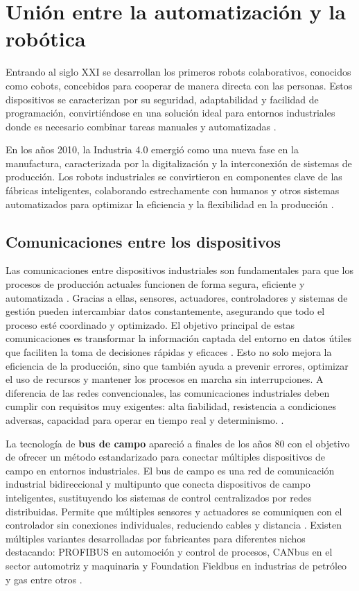 \section{Unión entre la automatización y la robótica}
\label{sec:terceraseccion}

Entrando al siglo XXI se desarrollan los primeros robots colaborativos, conocidos como cobots, concebidos para cooperar de manera directa con las personas. Estos dispositivos se caracterizan por su seguridad, adaptabilidad y facilidad de programación, convirtiéndose en una solución ideal para entornos industriales donde es necesario combinar tareas manuales y automatizadas  \cite{intro_union}. 

En los años 2010, la Industria 4.0 emergió como una nueva fase en la manufactura, caracterizada por la digitalización y la interconexión de sistemas de producción.  Los robots industriales se convirtieron en componentes clave de las fábricas inteligentes, colaborando estrechamente con humanos y otros sistemas automatizados para optimizar la eficiencia y la flexibilidad en la producción \cite{intro_union}. 

\subsection{Comunicaciones entre los dispositivos}

Las comunicaciones entre dispositivos industriales son fundamentales para que los procesos de producción actuales funcionen de forma segura, eficiente y automatizada \cite{intro_com}. Gracias a ellas, sensores, actuadores, controladores y sistemas de gestión pueden intercambiar datos constantemente, asegurando que todo el proceso esté coordinado y optimizado. El objetivo principal de estas comunicaciones es transformar la información captada del entorno en datos útiles que faciliten la toma de decisiones rápidas y eficaces \cite{intro_com}. Esto no solo mejora la eficiencia de la producción, sino que también ayuda a prevenir errores, optimizar el uso de recursos y mantener los procesos en marcha sin interrupciones. A diferencia de las redes convencionales, las comunicaciones industriales deben cumplir con requisitos muy exigentes: alta fiabilidad, resistencia a condiciones adversas, capacidad para operar en tiempo real y determinismo. \cite{intro_com}. 

La tecnología de \textbf{bus de campo} apareció a finales de los años 80 con el objetivo de ofrecer un método estandarizado para conectar múltiples dispositivos de campo en entornos industriales. El bus de campo es una red de comunicación industrial bidireccional y multipunto que conecta dispositivos de campo inteligentes, sustituyendo los sistemas de control centralizados por redes distribuidas. Permite que múltiples sensores y actuadores se comuniquen con el controlador sin conexiones individuales, reduciendo cables y distancia \cite{info_bus}. Existen múltiples variantes desarrolladas por fabricantes para diferentes nichos destacando: PROFIBUS en automoción y control de procesos, CANbus en el sector automotriz y maquinaria y Foundation Fieldbus en industrias de petróleo y gas entre otros \cite{bus_vs_ethernet}.

